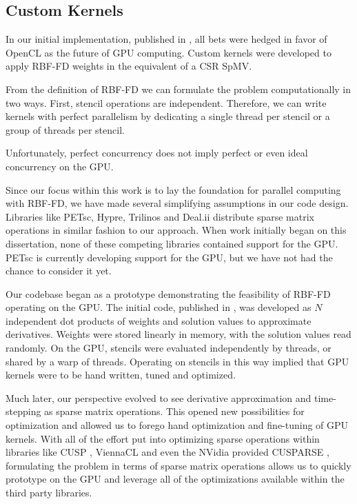 \documentclass{report}
\begin{document}
\subsection{Custom Kernels}
\label{sec:custom_gpu_kernels}


In our initial implementation, published in \cite{BolligFlyerErlebacher2012}, all bets were hedged in favor of OpenCL as the future of GPU computing. Custom kernels were developed to apply RBF-FD weights in the equivalent of a CSR SpMV. 

From the definition of RBF-FD we can formulate the problem computationally in two ways. First, stencil operations are independent. Therefore, we can write kernels with perfect parallelism by dedicating a single thread per stencil or a group of threads per stencil.  

Unfortunately, perfect concurrency does not imply perfect or even ideal concurrency on the GPU. 

Since our focus within this work is to lay the foundation for parallel computing
with RBF-FD, we have made several simplifying assumptions in our code design.
Libraries like PETsc, Hypre, Trilinos and Deal.ii distribute sparse matrix
operations in similar fashion to our approach. When work initially began on this
dissertation, none of these competing libraries contained support for the GPU.
PETsc is currently developing support for the GPU, but we have not had the
chance to consider it yet. 

Our codebase began as a prototype demonstrating the feasibility of RBF-FD
operating on the GPU. The initial code, published in \cite{BolligFlyerErlebacher2012}, was developed as $N$ independent dot
products of weights and solution values to approximate derivatives. Weights were
stored linearly in memory, with the solution values read randomly. On the GPU,
stencils were evaluated independently by threads, or shared by a warp of
threads. Operating on stencils in this way implied that GPU kernels were to be
hand written, tuned and optimized. 

Much later, our perspective evolved to see derivative approximation and
time-stepping as sparse matrix operations. This opened new possibilities for
optimization and allowed us to forego hand optimization and fine-tuning of GPU
kernels. With all of the effort put into optimizing sparse operations within
libraries like CUSP \cite{Bell2009}, ViennaCL \cite{Rupp2010} and even the
NVidia provided CUSPARSE \cite{CudaToolkitDoc}, formulating the problem in terms of
sparse matrix operations allows us to quickly prototype on the GPU and leverage
all of the optimizations available within the third party libraries. 
\end{document}
